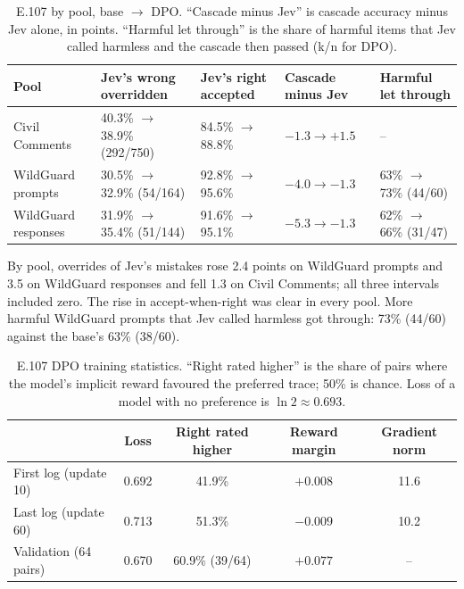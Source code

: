 \documentclass[11pt]{article}
\renewcommand{\_}{\origunderscore\allowbreak}
\begin{document}
\begin{table}[H]
\centering
\small
\caption{E.107 by pool, base $\rightarrow$ DPO. ``Cascade minus Jev'' is cascade accuracy minus Jev alone, in points. ``Harmful let through'' is the share of harmful items that Jev called harmless and the cascade then passed (k/n for DPO).}
\label{tab:e107-pools}
\begin{tabularx}{\textwidth}{p{2.6cm}XXp{2.0cm}X}
\toprule
Pool & Jev's wrong overridden & Jev's right accepted & Cascade minus Jev & Harmful let through \\
\midrule
Civil Comments & 40.3\% $\rightarrow$ 38.9\% (292/750) & 84.5\% $\rightarrow$ 88.8\% & $-1.3 \rightarrow +1.5$ & -- \\
WildGuard prompts & 30.5\% $\rightarrow$ 32.9\% (54/164) & 92.8\% $\rightarrow$ 95.6\% & $-4.0 \rightarrow -1.3$ & 63\% $\rightarrow$ 73\% (44/60) \\
WildGuard responses & 31.9\% $\rightarrow$ 35.4\% (51/144) & 91.6\% $\rightarrow$ 95.1\% & $-5.3 \rightarrow -1.3$ & 62\% $\rightarrow$ 66\% (31/47) \\
\bottomrule
\end{tabularx}
\end{table}

By pool, overrides of Jev's mistakes rose 2.4 points on WildGuard prompts and 3.5 on WildGuard responses and fell 1.3 on Civil Comments; all three intervals included zero. The rise in accept-when-right was clear in every pool. More harmful WildGuard prompts that Jev called harmless got through: 73\% (44/60) against the base's 63\% (38/60).

\begin{table}[H]
\centering
\small
\caption{E.107 DPO training statistics. ``Right rated higher'' is the share of pairs where the model's implicit reward favoured the preferred trace; 50\% is chance. Loss of a model with no preference is $\ln 2 \approx 0.693$.}
\label{tab:e107-training}
\begin{tabular}{lcccc}
\toprule
 & Loss & Right rated higher & Reward margin & Gradient norm \\
\midrule
First log (update 10) & 0.692 & 41.9\% & $+0.008$ & 11.6 \\
Last log (update 60) & 0.713 & 51.3\% & $-0.009$ & 10.2 \\
Validation (64 pairs) & 0.670 & 60.9\% (39/64) & $+0.077$ & -- \\
\bottomrule
\end{tabular}
\end{table}
\end{document}
